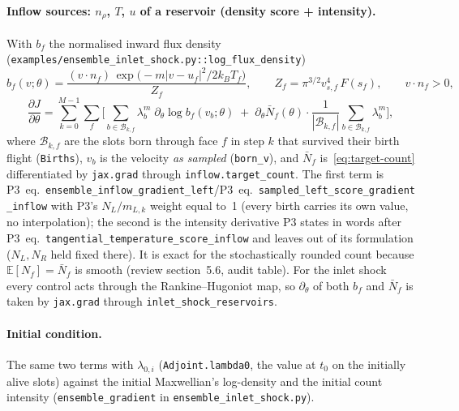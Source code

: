 \documentclass[11pt,a4paper]{article}
\numberwithin{equation}{section}
\newcommand{\E}{\mathbb{E}}
\newcommand{\code}[1]{\texttt{#1}}
\newcommand{\pref}[1]{P3~eq.~\code{#1}}
\begin{document}
\paragraph{Inflow sources: $n_\rho$, $T$, $u$ of a reservoir (density score + intensity).}
With $b_f$ the normalised inward flux density (\code{examples/ensemble\_inlet\_shock.py::log\_flux\_density})
\begin{equation}
\label{eq:flux-density}
b_f(v;\theta) = \frac{(v\cdot n_f)\, \exp\!\big(-m|v - u_f|^2/2k_B T_f\big)}{Z_f},
\qquad Z_f = \pi^{3/2} v_{s,f}^4\, F(s_f),\qquad v\cdot n_f > 0,
\end{equation}
\begin{equation}
\label{eq:source-gradient}
\frac{\partial J}{\partial \theta} =
\sum_{k=0}^{M-1}\sum_{f}\Big[
\sum_{b \in \mathcal B_{k,f}} \lambda^m_{b}\; \partial_\theta \log b_f(v_b;\theta)
\;+\;
\partial_\theta \bar N_f(\theta)\cdot \frac{1}{|\mathcal B_{k,f}|}\sum_{b \in \mathcal B_{k,f}} \lambda^m_{b}
\Big],
\end{equation}
where $\mathcal B_{k,f}$ are the slots born through face $f$ in step $k$ that survived
their birth flight (\code{Births}), $v_b$ is the velocity \emph{as sampled}
(\code{born\_v}), and $\bar N_f$ is~\eqref{eq:target-count} differentiated by
\code{jax.grad} through \code{inflow.target\_count}.  The first term is
\pref{ensemble\_inflow\_gradient\_left}/\pref{sampled\_left\_score\_gradient\_inflow}
with P3's $N_L/m_{L,k}$ weight equal to~1 (every birth carries its own value, no
interpolation); the second is the intensity derivative P3 states in words after
\pref{tangential\_temperature\_score\_inflow} and leaves out of its formulation
($N_L, N_R$ held fixed there).  It is exact for the stochastically rounded count
because $\E[N_f] = \bar N_f$ is smooth (review section~5.6, audit table).  For the inlet
shock every control acts through the Rankine--Hugoniot map, so
$\partial_\theta$ of both $b_f$ and $\bar N_f$ is taken by \code{jax.grad} through
\code{inlet\_shock\_reservoirs}.

\paragraph{Initial condition.}
The same two terms with $\lambda_{0,i}$ (\code{Adjoint.lambda0}, the value at $t_0$ on
the initially alive slots) against the initial Maxwellian's log-density and the
initial count intensity (\code{ensemble\_gradient} in \code{ensemble\_inlet\_shock.py}).
\end{document}
